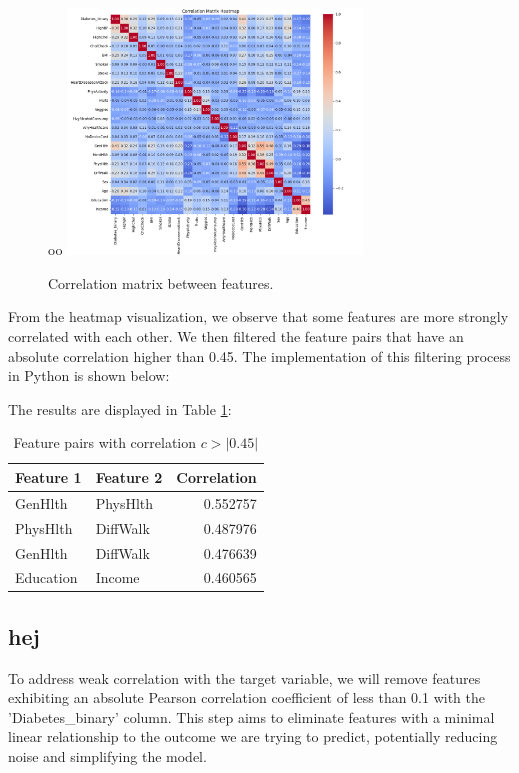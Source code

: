 

\begin{figure}[H]
    \centering
oo    \includegraphics[width=0.7\textwidth]{images/diabetes_correlation_matrix.png}
    \caption{Correlation matrix between features.}
    \label{fig:correlation-matrix}
\end{figure}

From the heatmap visualization, we observe that some features are more strongly correlated with each other. We then filtered the feature pairs that have an absolute correlation higher than 0.45. The implementation of this filtering process in Python is shown below:



The results are displayed in Table \ref{table:correlation-filtered}:

\begin{table}[ht]
\centering
\begin{tabular}{ |l|l|r| }
\hline
\textbf{Feature 1} & \textbf{Feature 2} & \textbf{Correlation} \\
\hline
GenHlth    & PhysHlth   & 0.552757 \\
PhysHlth   & DiffWalk   & 0.487976 \\
GenHlth    & DiffWalk   & 0.476639 \\
Education  & Income     & 0.460565 \\
\hline
\end{tabular}
\caption{Feature pairs with correlation $c > |0.45|$}
\label{table:correlation-filtered}
\end{table}
\subsection{hej}
To address weak correlation with the target variable, we will remove features exhibiting an absolute Pearson correlation coefficient of less than 0.1 with the 'Diabetes_binary' column. This step aims to eliminate features with a minimal linear relationship to the outcome we are trying to predict, potentially reducing noise and simplifying the model.

